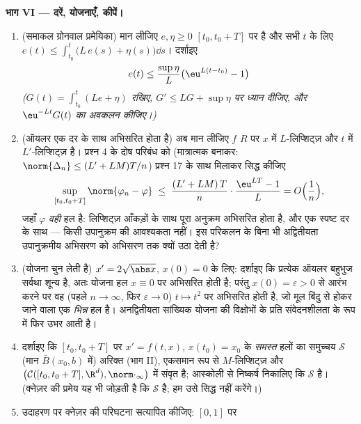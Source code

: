 \begin{problem}[{सप्ताहांत समस्या --- लिप्शिट्ज़ के बिना $x' = f(t, x)$ के
हलों का अस्तित्व}]
\medskip
\noindent\textbf{भाग VI --- दरें, योजनाएँ, कीपें।}
\begin{enumerate}[resume]
  \item (समाकल ग्रोनवाल प्रमेयिका) मान लीजिए $e, \eta \geq 0$ $[t_0, t_0+T]$ पर 
        है और सभी $t$ के लिए $e(t) \leq \int_{t_0}
        ^t\bigl(L\,e(s) + \eta(s)\bigr)\dd s$। दर्शाइए
        \[
        e(t) \leq \frac{\sup\eta}{L}\bigl(\eu^{L(t - t_0)} -
        1\bigr)
        \]
        \emph{($G(t) = \int_{t_0}^t(Le + \eta)$ रखिए, $G'
        \leq LG + \sup\eta$ पर ध्यान दीजिए, और $\eu^{-Lt}G(t)$ का
        अवकलन कीजिए।)}
  \item (ऑयलर एक दर के साथ अभिसरित होता है) अब मान लीजिए $f$
        $R$ पर $x$ में $L$-लिप्शिट्ज़ और $t$ में
        $L'$-लिप्शिट्ज़ है। प्रश्न 4 के दोष परिबंध को (मात्रात्मक
        बनाकर: $\norm{\Delta_n} \leq (L' + LM)T/n$) प्रश्न 17 के साथ मिलाकर सिद्ध कीजिए
        \[
        \sup_{[t_0, t_0+T]}\norm{\varphi_n - \varphi}
        \;\leq\; \frac{(L' + LM)\,T}{n}\cdot
        \frac{\eu^{LT} - 1}{L} = O\Bigl(\frac1n\Bigr),
        \]
        जहाँ $\varphi$ \emph{वही} हल है: लिप्शिट्ज़ आँकड़ों के साथ
        पूरा अनुक्रम अभिसरित होता है, और एक स्पष्ट दर के साथ ---
        किसी उपानुक्रम की आवश्यकता नहीं। इस परिकलन के बिना भी
        अद्वितीयता उपानुक्रमीय अभिसरण को  अभिसरण तक क्यों
        उठा देती है?
  \item (योजना चुन लेती है) $x' = 2\sqrt{\abs x}$, $x(0) =
        0$ के लिए: दर्शाइए कि
        प्रत्येक ऑयलर बहुभुज सर्वथा शून्य है, अतः योजना हल $x \equiv 0$
        पर अभिसरित होती है; परंतु $x(0) = \varepsilon > 0$ से आरंभ करने पर वह (पहले
        $n \to \infty$, फिर $\varepsilon \to 0$) $t
        \mapsto t^2$ पर अभिसरित होती है, जो मूल बिंदु
        से होकर जाने वाला एक \emph{भिन्न} हल है। अनद्वितीयता
        सांख्यिक योजना की विक्षोभों के प्रति संवेदनशीलता के रूप
        में फिर उभर आती है।
  \item दर्शाइए कि $[t_0, t_0+T]$ पर $x' = f(t,x)$, $x(t_0) = x_0$ के \emph{समस्त} हलों का
        समुच्चय $\mathcal S$ (मान $\bar B(x_0, b)$ में) अरिक्त (भाग II), एकसमान
        रूप से $M$-लिप्शिट्ज़ और $\bigl(\mathcal C([t_0, t_0+T], \R^d),
        \norm\cdot_\infty\bigr)$ में संवृत है; आस्कोली से
        निष्कर्ष निकालिए कि $\mathcal S$ \emph{} है। (क्नेज़र की
        प्रमेय यह भी जोड़ती है कि $\mathcal S$  है; हम उसे सिद्ध
        नहीं करेंगे।)
  \item उदाहरण पर क्नेज़र की परिघटना सत्यापित कीजिए: $[0, 1]$ पर

\end{enumerate}
\end{problem}
